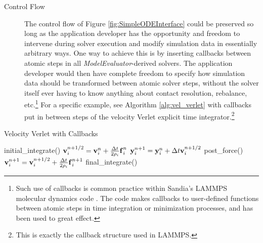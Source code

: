 \documentclass[pdf,ps2pdf,12pt,report]{SANDreport}
\theoremstyle{plain}
\theoremstyle{definition}
\theoremstyle{remark}
\numberwithin{equation}{section}
\newcommand{\bdf}{\ensuremath{\mbox{\textbf{f}}}}
\newcommand{\bdy}{\ensuremath{\mbox{\textbf{y}}}}
\newcommand{\bdv}{\ensuremath{\mbox{\textbf{v}}}}
\begin{document}
\begin{description}
  \item[Control Flow] The control flow of Figure \ref{fig:SimpleODEInterface} could be preserved so long as the application developer has the opportunity and freedom to intervene during solver execution and modify simulation data in essentially arbitrary ways. One way to achieve this is by inserting callbacks between atomic steps in all \emph{ModelEvaluator}-derived solvers. The application developer would then have complete freedom to specify how simulation data should be transformed between atomic solver steps, without the solver itself ever having to know anything about contact resolution, rebalance, etc.\footnote{Such use of callbacks is common practice within Sandia's LAMMPS molecular dynamics code \cite{Plimpton:LAMMPS:1995}. The code makes callbacks to user-defined functions between atomic steps in time integration or minimization processes, and has been used to great effect.} For a specific example, see Algorithm \ref{alg:vel_verlet} with callbacks put in between steps of the velocity Verlet explicit time integrator.\footnote{This is exactly the callback structure used in LAMMPS.}
\end{description}

\begin{algorithm}
\caption{Velocity Verlet with Callbacks} \label{alg:vel_verlet}
\begin{algorithmic}[1]
   \STATE initial\_integrate()
   \STATE $\bdv_i^{n + 1/2} = \bdv_i^n + \frac{\Delta t}{2 \rho_i} \bdf_i^n$
   \STATE $\bdy_i^{n+1}     = \bdy_i^n + \Delta t \bdv_i^{n + 1/2}$
   \STATE post\_force()
   \STATE $\bdv_i^{n+1} = \bdv_i^{n+1/2} + \frac{\Delta t}{2 \rho_i} \bdf_i^{n+1}$
   \STATE final\_integrate()
\end{algorithmic}
\end{algorithm}

    \nocite{*}


    \clearpage
    \providecommand*{\phantomsection}{}
    \phantomsection
    
    





    
\end{document}

